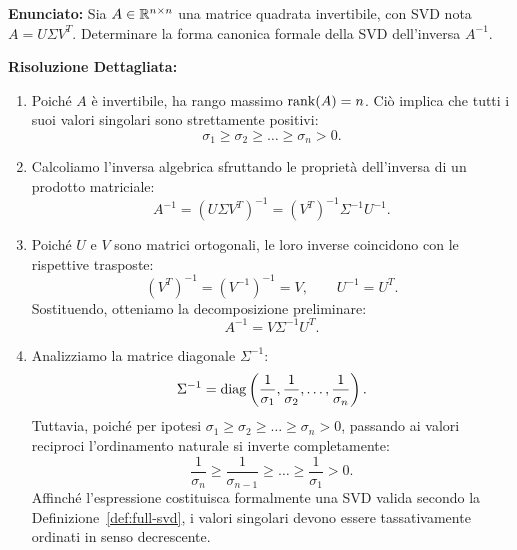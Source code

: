 \begin{example}
\textbf{Enunciato:} Sia $A \in \mathbb{R}^{n \times n}$ una matrice quadrata invertibile, con SVD nota $A = U \Sigma V^T$. Determinare la forma canonica formale della SVD dell'inversa $A^{-1}$.

\medskip
\textbf{Risoluzione Dettagliata:}
\begin{enumerate}
    \item Poich\'e $A$ \`e invertibile, ha rango massimo $\operatorname{rank}(A) = n$. Ci\`o implica che tutti i suoi valori singolari sono strettamente positivi:
    \begin{equation}
        \sigma_1 \ge \sigma_2 \ge \dots \ge \sigma_n > 0.
    \end{equation}
    \item Calcoliamo l'inversa algebrica sfruttando le propriet\`a dell'inversa di un prodotto matriciale:
    \begin{equation}
        A^{-1} = (U \Sigma V^T)^{-1} = (V^T)^{-1} \Sigma^{-1} U^{-1}.
    \end{equation}
    \item Poich\'e $U$ e $V$ sono matrici ortogonali, le loro inverse coincidono con le rispettive trasposte:
    \begin{equation}
        (V^T)^{-1} = (V^{-1})^{-1} = V, \qquad U^{-1} = U^T.
    \end{equation}
    Sostituendo, otteniamo la decomposizione preliminare:
    \begin{equation}
        A^{-1} = V \Sigma^{-1} U^T.
    \end{equation}
    \item Analizziamo la matrice diagonale $\Sigma^{-1}$:
    \begin{equation}
        \Sigma^{-1} = \operatorname{diag}\left(\frac{1}{\sigma_1}, \frac{1}{\sigma_2}, \dots, \frac{1}{\sigma_n}\right).
    \end{equation}
    Tuttavia, poich\'e per ipotesi $\sigma_1 \ge \sigma_2 \ge \dots \ge \sigma_n > 0$, passando ai valori reciproci l'ordinamento naturale si inverte completamente:
    \begin{equation}
        \frac{1}{\sigma_n} \ge \frac{1}{\sigma_{n-1}} \ge \dots \ge \frac{1}{\sigma_1} > 0.
    \end{equation}
    Affinch\'e l'espressione costituisca formalmente una SVD valida secondo la Definizione~\ref{def:full-svd}, i valori singolari devono essere tassativamente ordinati in senso decrescente.


\end{enumerate}
\end{example}
